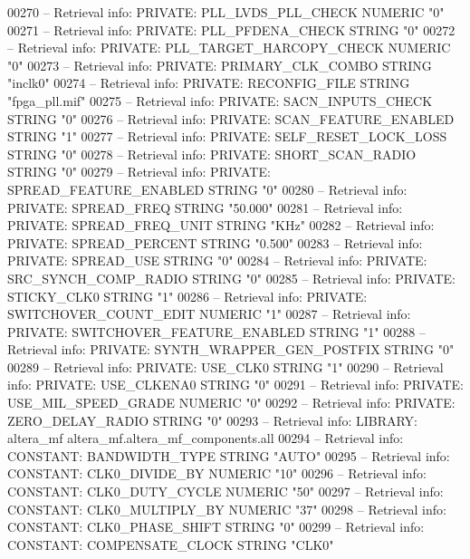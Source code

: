 \begin{DoxyCode}
{00270 \textcolor{keyword}{-- Retrieval info: PRIVATE: PLL\_LVDS\_PLL\_CHECK NUMERIC "0"}
00271 \textcolor{keyword}{-- Retrieval info: PRIVATE: PLL\_PFDENA\_CHECK STRING "0"}
00272 \textcolor{keyword}{-- Retrieval info: PRIVATE: PLL\_TARGET\_HARCOPY\_CHECK NUMERIC "0"}
00273 \textcolor{keyword}{-- Retrieval info: PRIVATE: PRIMARY\_CLK\_COMBO STRING "inclk0"}
00274 \textcolor{keyword}{-- Retrieval info: PRIVATE: RECONFIG\_FILE STRING "fpga\_pll.mif"}
00275 \textcolor{keyword}{-- Retrieval info: PRIVATE: SACN\_INPUTS\_CHECK STRING "0"}
00276 \textcolor{keyword}{-- Retrieval info: PRIVATE: SCAN\_FEATURE\_ENABLED STRING "1"}
00277 \textcolor{keyword}{-- Retrieval info: PRIVATE: SELF\_RESET\_LOCK\_LOSS STRING "0"}
00278 \textcolor{keyword}{-- Retrieval info: PRIVATE: SHORT\_SCAN\_RADIO STRING "0"}
00279 \textcolor{keyword}{-- Retrieval info: PRIVATE: SPREAD\_FEATURE\_ENABLED STRING "0"}
00280 \textcolor{keyword}{-- Retrieval info: PRIVATE: SPREAD\_FREQ STRING "50.000"}
00281 \textcolor{keyword}{-- Retrieval info: PRIVATE: SPREAD\_FREQ\_UNIT STRING "KHz"}
00282 \textcolor{keyword}{-- Retrieval info: PRIVATE: SPREAD\_PERCENT STRING "0.500"}
00283 \textcolor{keyword}{-- Retrieval info: PRIVATE: SPREAD\_USE STRING "0"}
00284 \textcolor{keyword}{-- Retrieval info: PRIVATE: SRC\_SYNCH\_COMP\_RADIO STRING "0"}
00285 \textcolor{keyword}{-- Retrieval info: PRIVATE: STICKY\_CLK0 STRING "1"}
00286 \textcolor{keyword}{-- Retrieval info: PRIVATE: SWITCHOVER\_COUNT\_EDIT NUMERIC "1"}
00287 \textcolor{keyword}{-- Retrieval info: PRIVATE: SWITCHOVER\_FEATURE\_ENABLED STRING "1"}
00288 \textcolor{keyword}{-- Retrieval info: PRIVATE: SYNTH\_WRAPPER\_GEN\_POSTFIX STRING "0"}
00289 \textcolor{keyword}{-- Retrieval info: PRIVATE: USE\_CLK0 STRING "1"}
00290 \textcolor{keyword}{-- Retrieval info: PRIVATE: USE\_CLKENA0 STRING "0"}
00291 \textcolor{keyword}{-- Retrieval info: PRIVATE: USE\_MIL\_SPEED\_GRADE NUMERIC "0"}
00292 \textcolor{keyword}{-- Retrieval info: PRIVATE: ZERO\_DELAY\_RADIO STRING "0"}
00293 \textcolor{keyword}{-- Retrieval info: LIBRARY: altera\_mf altera\_mf.altera\_mf\_components.all}
00294 \textcolor{keyword}{-- Retrieval info: CONSTANT: BANDWIDTH\_TYPE STRING "AUTO"}
00295 \textcolor{keyword}{-- Retrieval info: CONSTANT: CLK0\_DIVIDE\_BY NUMERIC "10"}
00296 \textcolor{keyword}{-- Retrieval info: CONSTANT: CLK0\_DUTY\_CYCLE NUMERIC "50"}
00297 \textcolor{keyword}{-- Retrieval info: CONSTANT: CLK0\_MULTIPLY\_BY NUMERIC "37"}
00298 \textcolor{keyword}{-- Retrieval info: CONSTANT: CLK0\_PHASE\_SHIFT STRING "0"}
00299 \textcolor{keyword}{-- Retrieval info: CONSTANT: COMPENSATE\_CLOCK STRING "CLK0"}
}
\end{DoxyCode}
